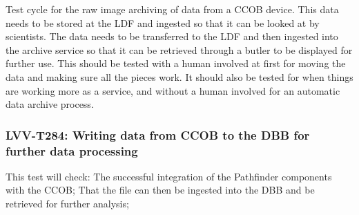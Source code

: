 \documentclass[DM,lsstdraft,STR,toc]{lsstdoc}
\begin{document}
Test cycle for the raw image archiving of data from a CCOB device.  This data needs to be stored at the LDF and ingested so that it can be looked at by scientists.   The data needs to be transferred to the LDF and then ingested into the archive service so that it can be retrieved through a butler to be displayed for further use.   This should be tested with a human involved at first for moving the data and making sure all the pieces work.   It should also be tested for when things are working more as a service, and without a human involved for an automatic data archive process.   

\subsubsection{LVV-T284: Writing data from CCOB to the DBB for further data processing}

This test will check:
The successful integration of the Pathfinder components with the CCOB;
That the file can then be ingested into the DBB and be retrieved for further analysis;
\end{document}
